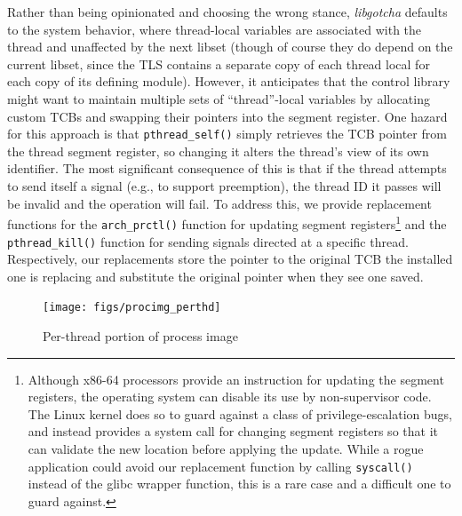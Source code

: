 Rather than being opinionated and choosing the wrong stance, \textit{libgotcha}
defaults to the system behavior, where thread-local variables are
associated with the thread and unaffected by the next libset (though of course they
do depend on the current libset, since the TLS contains a separate copy of each
thread local for each copy of its defining module).  However, it anticipates that the
control library might want to maintain multiple sets of ``thread''-local variables by
allocating custom TCBs and swapping their pointers into the segment register.  One
hazard for this approach is that \texttt{pthread\_self()} simply retrieves the TCB
pointer from the thread segment register, so changing it alters the thread's view of
its own identifier.  The most significant consequence of this is that if the thread
attempts to send itself a signal (e.g., to support preemption), the thread ID it
passes will be invalid and the operation will fail.  To address this, we provide
replacement functions for the \texttt{arch\_prctl()} function for updating segment
registers\footnote{Although x86-64 processors provide an instruction for updating the
segment registers, the operating system can disable its use by non-supervisor code.
The Linux kernel does so to guard against a class of privilege-escalation bugs, and
instead provides a system call for changing segment registers so that it can validate
the new location before applying the update.  While a rogue application could avoid
our replacement function by calling \texttt{syscall()} instead of the glibc wrapper
function, this is a rare case and a difficult one to guard against.} and the
\texttt{pthread\_kill()} function for sending signals directed at a specific thread.
Respectively, our replacements store the pointer to the original TCB the installed
one is replacing and substitute the original pointer when they see one saved.

\begin{figure}
\texttt{[image: figs/procimg\_perthd]}
\caption{Per-thread portion of process image}
\label{fig:procimgthd}
\end{figure}

